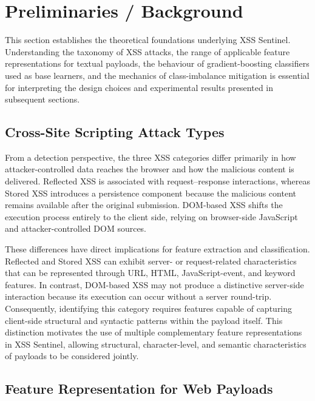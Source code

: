 \documentclass[11pt,a4paper]{article}
\begin{document}
\section{Preliminaries / Background}
\label{sec:prelim}

This section establishes the theoretical foundations underlying XSS Sentinel. Understanding the
taxonomy of XSS attacks, the range of applicable feature representations for textual payloads, the
behaviour of gradient-boosting classifiers used as base learners, and the mechanics of class-imbalance
mitigation is essential for interpreting the design choices and experimental results presented in
subsequent sections.

\subsection{Cross-Site Scripting Attack Types}

From a detection perspective, the three XSS categories differ primarily in how
attacker-controlled data reaches the browser and how the malicious content is
delivered. Reflected XSS is associated with request--response interactions,
whereas Stored XSS introduces a persistence component because the malicious
content remains available after the original submission. DOM-based XSS shifts
the execution process entirely to the client side, relying on browser-side
JavaScript and attacker-controlled DOM sources.

These differences have direct implications for feature extraction and
classification. Reflected and Stored XSS can exhibit server- or
request-related characteristics that can be represented through URL,
HTML, JavaScript-event, and keyword features. In contrast, DOM-based XSS may
not produce a distinctive server-side interaction because its execution can
occur without a server round-trip. Consequently, identifying this category
requires features capable of capturing client-side structural and syntactic
patterns within the payload itself. This distinction motivates the use of
multiple complementary feature representations in XSS Sentinel, allowing
structural, character-level, and semantic characteristics of payloads to be
considered jointly.

\subsection{Feature Representation for Web Payloads}
\end{document}
